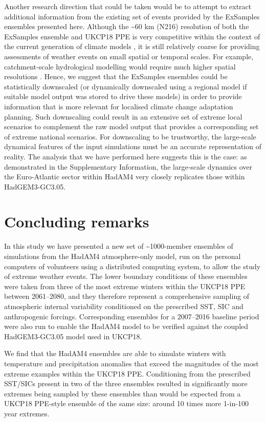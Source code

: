   Another research direction that could be taken would be to attempt to extract additional information from the existing set of events provided by the ExSamples ensembles presented here. Although the \textasciitilde60 km (N216) resolution of both the ExSamples ensemble and UKCP18 PPE is very competitive within the context of the current generation of climate models \citep{cmip6_source_id_values_cmip6_2022,eyring_overview_2016}, it is still relatively coarse for providing assessments of weather events on small spatial or temporal scales. For example, catchment-scale hydrological modelling would require much higher spatial resolutions \citep{charlton_assessing_2006}. Hence, we suggest that the ExSamples ensembles could be statistically downscaled (or dynamically downscaled using a regional model if suitable model output was stored to drive these models) in order to provide information that is more relevant for localised climate change adaptation planning. Such downscaling could result in an extensive set of extreme local scenarios to complement the raw model output that provides a corresponding set of extreme national scenarios. For downscaling to be trustworthy, the large-scale dynamical features of the input simulations must be an accurate representation of reality. The analysis that we have performed here suggests this is the case: as demonstrated in the Supplementary Information, the large-scale dynamics over the Euro-Atlantic sector within HadAM4 very closely replicates those within HadGEM3-GC3.05.
    
\section{Concluding remarks}\label{ch5:remarks}

  In this study we have presented a new set of \textasciitilde1000-member ensembles of simulations from the HadAM4 atmosphere-only model, run on the personal computers of volunteers using a distributed computing system, to allow the study of extreme weather events. The lower boundary conditions of these ensembles were taken from three of the most extreme winters within the UKCP18 PPE between 2061--2080, and they therefore represent a comprehensive sampling of atmospheric internal variability conditioned on the prescribed SST, SIC and anthropogenic forcings. Corresponding ensembles for a 2007--2016 baseline period were also run to enable the HadAM4 model to be verified against the coupled HadGEM3-GC3.05 model used in UKCP18.
  
  We find that the HadAM4 ensembles are able to simulate winters with temperature and precipitation anomalies that exceed the magnitudes of the most extreme examples within the UKCP18 PPE. Conditioning from the prescribed SST/SICs present in two of the three ensembles resulted in significantly more extremes being sampled by these ensembles than would be expected from a UKCP18 PPE-style ensemble of the same size: around 10 times more 1-in-100 year extremes.
  
